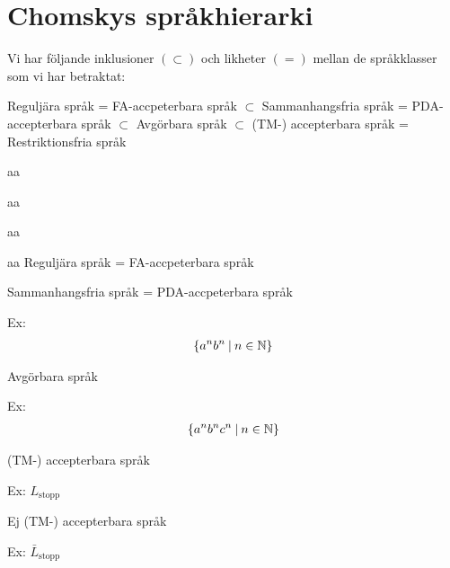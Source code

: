 \section{Chomskys språkhierarki}\par
\noindent Vi har följande inklusioner $(\subset)$ och likheter $(=)$ mellan de språkklasser som vi har betraktat:
\par\bigskip
Reguljära språk = FA-accpeterbara språk $\subset$ Sammanhangsfria språk = PDA-accepterbara språk $\subset$ Avgörbara språk $\subset$ (TM-) accepterbara språk = Restriktionsfria språk
\par\bigskip
\begin{tst}
  aa
  \begin{tst}
    aa
    \begin{tst}
      aa
      \begin{tst}
        aa
        Reguljära språk = FA-accpeterbara språk
      \end{tst}
      \par\bigskip
      Sammanhangsfria språk = PDA-accpeterbara språk\par
      Ex:
      \begin{equation*}
        \begin{gathered}
          \left\{a^nb^n\:|\: n\in\mathbb{N}\right\}
        \end{gathered}
      \end{equation*}
    \end{tst}
    \par\bigskip
    Avgörbara språk\par
    Ex:
    \begin{equation*}
      \begin{gathered}
        \left\{a^nb^nc^n\:|\: n\in\mathbb{N}\right\}
      \end{gathered}
    \end{equation*}
  \end{tst}
  \par\bigskip
  (TM-) accepterbara språk\par
  Ex: $L_{\text{stopp}}$
\end{tst}
\par\bigskip
Ej (TM-) accepterbara språk\par
Ex: $\bar{L}_{\text{stopp}}$
